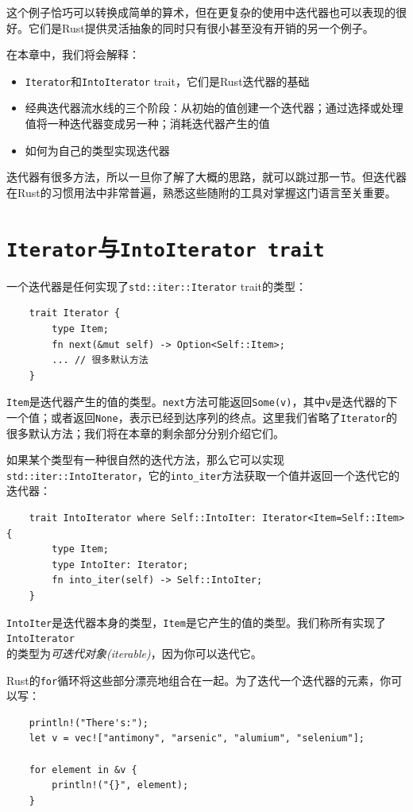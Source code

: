 这个例子恰巧可以转换成简单的算术，但在更复杂的使用中迭代器也可以表现的很好。它们是Rust提供灵活抽象的同时只有很小甚至没有开销的另一个例子。

在本章中，我们将会解释：
\begin{itemize}
    \item \texttt{Iterator}和\texttt{IntoIterator} trait，它们是Rust迭代器的基础
    \item 经典迭代器流水线的三个阶段：从初始的值创建一个迭代器；通过选择或处理值将一种迭代器变成另一种；消耗迭代器产生的值
    \item 如何为自己的类型实现迭代器
\end{itemize}

迭代器有很多方法，所以一旦你了解了大概的思路，就可以跳过那一节。但迭代器在Rust的习惯用法中非常普遍，熟悉这些随附的工具对掌握这门语言至关重要。

\section{\texttt{Iterator}与\texttt{IntoIterator trait}}\label{iter}

一个迭代器是任何实现了\texttt{std::iter::Iterator} trait的类型：
\begin{verbatim}
    trait Iterator {
        type Item;
        fn next(&mut self) -> Option<Self::Item>;
        ... // 很多默认方法
    }
\end{verbatim}

\texttt{Item}是迭代器产生的值的类型。\texttt{next}方法可能返回\texttt{Some(v)}，其中\texttt{v}是迭代器的下一个值；或者返回\texttt{None}，表示已经到达序列的终点。这里我们省略了\texttt{Iterator}的很多默认方法；我们将在本章的剩余部分分别介绍它们。

如果某个类型有一种很自然的迭代方法，那么它可以实现\texttt{std::iter::IntoIterator}，它的\texttt{into\_iter}方法获取一个值并返回一个迭代它的迭代器：
\begin{verbatim}
    trait IntoIterator where Self::IntoIter: Iterator<Item=Self::Item> {
        type Item;
        type IntoIter: Iterator;
        fn into_iter(self) -> Self::IntoIter;
    }
\end{verbatim}

\texttt{IntoIter}是迭代器本身的类型，\texttt{Item}是它产生的值的类型。我们称所有实现了\texttt{IntoIterator}\\
的类型为\emph{可迭代对象(iterable)}，因为你可以迭代它。

Rust的\texttt{for}循环将这些部分漂亮地组合在一起。为了迭代一个迭代器的元素，你可以写：
\begin{verbatim}
    println!("There's:");
    let v = vec!["antimony", "arsenic", "alumium", "selenium"];

    for element in &v {
        println!("{}", element);
    }
\end{verbatim}

